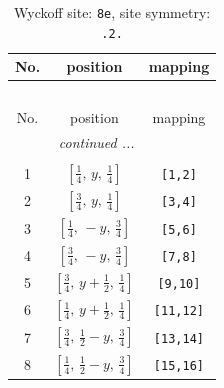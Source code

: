 \documentclass[fleqn,8pt]{jsarticle}
\begin{document}
\begin{longtable}{ccc}
\caption{Wyckoff site: {\tt 8e}, site symmetry: {\tt .2.}}
 \\
 \hline \hline
No. & position & mapping \\ \hline \endfirsthead

\multicolumn{2}{l}{\tablename\ \thetable{}} \\
 \hline \hline
No. & position & mapping \\ \hline \endhead

 \hline \hline
\multicolumn{2}{r}{\footnotesize\it continued ...} \\ \endfoot

 \hline \hline
\multicolumn{2}{r}{} \\ \endlastfoot

1 & $\left[ \frac{1}{4},\, y,\, \frac{1}{4} \right]$ & {\tt [1,2]} \\ \hline
2 & $\left[ \frac{3}{4},\, y,\, \frac{1}{4} \right]$ & {\tt [3,4]} \\ \hline
3 & $\left[ \frac{1}{4},\, - y,\, \frac{3}{4} \right]$ & {\tt [5,6]} \\ \hline
4 & $\left[ \frac{3}{4},\, - y,\, \frac{3}{4} \right]$ & {\tt [7,8]} \\ \hline
5 & $\left[ \frac{3}{4},\, y + \frac{1}{2},\, \frac{1}{4} \right]$ & {\tt [9,10]} \\ \hline
6 & $\left[ \frac{1}{4},\, y + \frac{1}{2},\, \frac{1}{4} \right]$ & {\tt [11,12]} \\ \hline
7 & $\left[ \frac{3}{4},\, \frac{1}{2} - y,\, \frac{3}{4} \right]$ & {\tt [13,14]} \\ \hline
8 & $\left[ \frac{1}{4},\, \frac{1}{2} - y,\, \frac{3}{4} \right]$ & {\tt [15,16]} \\
\end{longtable}
\renewcommand{\arraystretch}{1.2}
\end{document}
